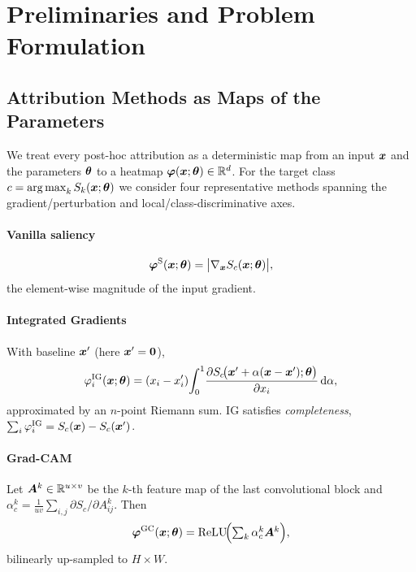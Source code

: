 \section{Preliminaries and Problem Formulation}
\label{sec:prelim}

\subsection{Attribution Methods as Maps of the Parameters}
We treat every post-hoc attribution as a deterministic map from an input
$\bm{x}$ and the parameters $\bm{\theta}$ to a heatmap $\bm{\varphi}(\bm{x};\bm{\theta})\in\mathbb{R}^{d}$.
For the target class $c=\operatorname*{arg\,max}_k S_k(\bm{x};\bm{\theta})$ we consider four
representative methods spanning the gradient/perturbation and
local/class-discriminative axes.

\paragraph{Vanilla saliency \cite{simonyan2014saliency}}
\begin{equation}
\bm{\varphi}^{\mathrm{S}}(\bm{x};\bm{\theta})=\bigl|\nabla_{\bm{x}}S_c(\bm{x};\bm{\theta})\bigr|,
\label{eq:sal}
\end{equation}
the element-wise magnitude of the input gradient.

\paragraph{Integrated Gradients \cite{sundararajan2017ig}}
With baseline $\bm{x}'$ (here $\bm{x}'=\bm 0$),
\begin{equation}
\varphi^{\mathrm{IG}}_i(\bm{x};\bm{\theta})=(x_i-x'_i)\!\int_{0}^{1}\!
\frac{\partial S_c\!\bigl(\bm{x}'+\alpha(\bm{x}-\bm{x}');\bm{\theta}\bigr)}{\partial x_i}\,
\mathrm d\alpha,
\label{eq:ig}
\end{equation}
approximated by an $n$-point Riemann sum. IG satisfies \emph{completeness},
$\sum_i\varphi^{\mathrm{IG}}_i=S_c(\bm{x})-S_c(\bm{x}')$.

\paragraph{Grad-CAM \cite{selvaraju2017gradcam}}
Let $\bm A^{k}\in\mathbb{R}^{u\times v}$ be the $k$-th feature map of the last
convolutional block and
$\alpha_c^{k}=\tfrac{1}{uv}\sum_{i,j}\partial S_c/\partial A^{k}_{ij}$. Then
\begin{equation}
\bm{\varphi}^{\mathrm{GC}}(\bm{x};\bm{\theta})=\operatorname{ReLU}\!\Bigl(\textstyle\sum_{k}\alpha_c^{k}
\bm A^{k}\Bigr),
\label{eq:gradcam}
\end{equation}
bilinearly up-sampled to $H\times W$.


